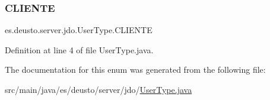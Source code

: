 \subsubsection{\texorpdfstring{CLIENTE}{CLIENTE}}
{\footnotesize\ttfamily es.\+deusto.\+server.\+jdo.\+User\+Type.\+C\+L\+I\+E\+N\+TE}



Definition at line 4 of file User\+Type.\+java.



The documentation for this enum was generated from the following file\+:\begin{DoxyCompactItemize}
\item 
src/main/java/es/deusto/server/jdo/\mbox{\hyperlink{_user_type_8java}{User\+Type.\+java}}\end{DoxyCompactItemize}

